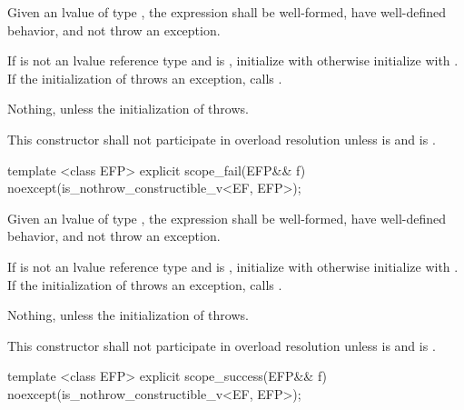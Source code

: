 \documentclass[ebook,11pt,article]{memoir}
\begin{document}
\begin{itemdescr}

\pnum
\requires Given an lvalue  of type , the expression  shall be well-formed, have well-defined behavior, and not throw an exception.


\pnum
\effects If  is not an lvalue reference type and  is , initialize   with  otherwise initialize  with . 
If the initialization of  throws an exception, calls .

\pnum
\throws Nothing, unless the initialization of  throws.

\pnum
\remarks
This constructor shall not participate in overload resolution unless
 is 
and  is .
\end{itemdescr}


\begin{itemdecl}
template <class EFP>
explicit
scope_fail(EFP&& f) noexcept(is_nothrow_constructible_v<EF, EFP>);

\end{itemdecl}

\begin{itemdescr}
\pnum
\requires Given an lvalue  of type , the expression  shall be well-formed, have well-defined behavior, and not throw an exception.

\pnum
\effects If  is not an lvalue reference type and  is , initialize   with  otherwise initialize  with . If the initialization of  throws an exception, calls .

\pnum
\throws Nothing, unless the initialization of  throws.

\pnum
\remarks This constructor shall not participate in overload resolution unless 
 is 
and  is .
\end{itemdescr}

\begin{itemdecl}
template <class EFP>
explicit
scope_success(EFP&& f) noexcept(is_nothrow_constructible_v<EF, EFP>);
\end{itemdecl}
\end{document}
